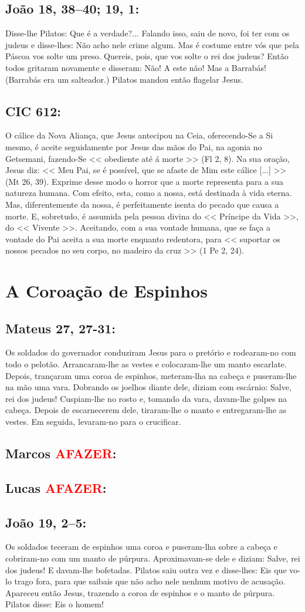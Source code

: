\documentclass[10pt,a5paper]{book}
\newcommand{\from}[1]{\subsection*{#1}}
\newcommand{\TODO}{\textcolor{red}{\ttfamily AFAZER}}
\begin{document}
\from{João 18, 38--40; 19, 1:}

Disse-lhe Pilatos: Que é a verdade?...
Falando isso, saiu de novo, foi ter com os judeus e disse-lhes:
Não acho nele crime algum.
Mas é costume entre vós que pela Páscoa vos solte um preso.
Quereis, pois, que vos solte o rei dos judeus?
Então todos gritaram novamente e disseram:
Não! A este não! Mas a Barrabás! (Barrabás era um salteador.)
Pilatos mandou então flagelar Jesus.

\from{CIC 612:}

O cálice da Nova Aliança, que Jesus antecipou na Ceia, oferecendo-Se a Si mesmo, é aceite seguidamente por Jesus das mãos do Pai, na agonia no Getsemani, fazendo-Se << obediente até á morte >> (Fl 2, 8).
Na sua oração, Jesus diz:
<< Meu Pai, se é possível, que se afaste de Mim este cálice [...] >> (Mt 26, 39).
Exprime desse modo o horror que a morte representa para a sua natureza humana.
Com efeito, esta, como a nossa, está destinada à vida eterna.
Mas, diferentemente da nossa, é perfeitamente isenta do pecado que causa a morte.
E, sobretudo, é assumida pela pessoa divina do << Príncipe da Vida >>, do << Vivente >>.
Aceitando, com a sua vontade humana, que se faça a vontade do Pai aceita a sua morte enquanto redentora, para << suportar os nossos pecados no seu corpo, no madeiro da cruz >> (1 Pe 2, 24).


\section{A Coroação de Espinhos}

\from{Mateus 27, 27-31:}

Os soldados do governador conduziram Jesus para o pretório e rodearam-no com todo o pelotão.
Arrancaram-lhe as vestes e colocaram-lhe um manto escarlate.
Depois, trançaram uma coroa de espinhos, meteram-lha na cabeça e puseram-lhe na mão uma vara.
Dobrando os joelhos diante dele, diziam com escárnio:
Salve, rei dos judeus!
Cuspiam-lhe no rosto e, tomando da vara, davam-lhe golpes na cabeça.
Depois de escarnecerem dele, tiraram-lhe o manto e entregaram-lhe as vestes.
Em seguida, levaram-no para o crucificar.

\from{Marcos \TODO:}

\from{Lucas \TODO:}

\from{João 19, 2--5:}

Os soldados teceram de espinhos uma coroa e puseram-lha sobre a cabeça e cobriram-no com um manto de púrpura.
Aproximavam-se dele e diziam:
Salve, rei dos judeus! E davam-lhe bofetadas.
Pilatos saiu outra vez e disse-lhes:
Eis que vo-lo trago fora, para que saibais que não acho nele nenhum motivo de acusação.
Apareceu então Jesus, trazendo a coroa de espinhos e o manto de púrpura.
Pilatos disse:
Eis o homem!
\end{document}
